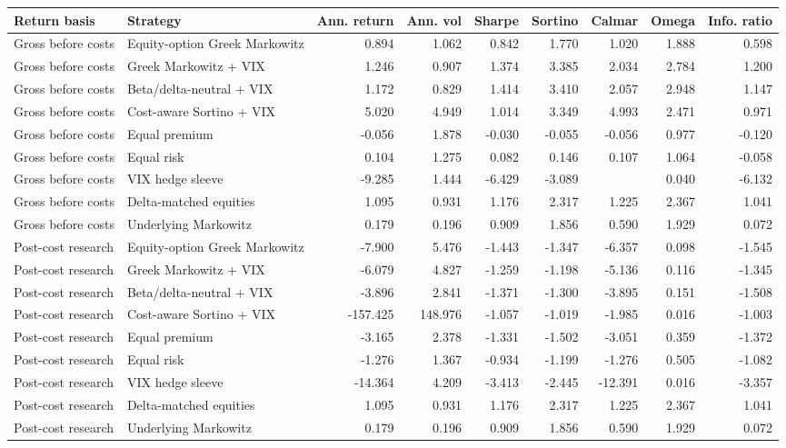\begin{tabular}{llrrrrrrr}
\toprule
Return basis & Strategy & Ann. return & Ann. vol & Sharpe & Sortino & Calmar & Omega & Info. ratio \\
\midrule
Gross before costs & Equity-option Greek Markowitz & 0.894 & 1.062 & 0.842 & 1.770 & 1.020 & 1.888 & 0.598 \\
Gross before costs & Greek Markowitz + VIX & 1.246 & 0.907 & 1.374 & 3.385 & 2.034 & 2.784 & 1.200 \\
Gross before costs & Beta/delta-neutral + VIX & 1.172 & 0.829 & 1.414 & 3.410 & 2.057 & 2.948 & 1.147 \\
Gross before costs & Cost-aware Sortino + VIX & 5.020 & 4.949 & 1.014 & 3.349 & 4.993 & 2.471 & 0.971 \\
Gross before costs & Equal premium & -0.056 & 1.878 & -0.030 & -0.055 & -0.056 & 0.977 & -0.120 \\
Gross before costs & Equal risk & 0.104 & 1.275 & 0.082 & 0.146 & 0.107 & 1.064 & -0.058 \\
Gross before costs & VIX hedge sleeve & -9.285 & 1.444 & -6.429 & -3.089 &  & 0.040 & -6.132 \\
Gross before costs & Delta-matched equities & 1.095 & 0.931 & 1.176 & 2.317 & 1.225 & 2.367 & 1.041 \\
Gross before costs & Underlying Markowitz & 0.179 & 0.196 & 0.909 & 1.856 & 0.590 & 1.929 & 0.072 \\
Post-cost research & Equity-option Greek Markowitz & -7.900 & 5.476 & -1.443 & -1.347 & -6.357 & 0.098 & -1.545 \\
Post-cost research & Greek Markowitz + VIX & -6.079 & 4.827 & -1.259 & -1.198 & -5.136 & 0.116 & -1.345 \\
Post-cost research & Beta/delta-neutral + VIX & -3.896 & 2.841 & -1.371 & -1.300 & -3.895 & 0.151 & -1.508 \\
Post-cost research & Cost-aware Sortino + VIX & -157.425 & 148.976 & -1.057 & -1.019 & -1.985 & 0.016 & -1.003 \\
Post-cost research & Equal premium & -3.165 & 2.378 & -1.331 & -1.502 & -3.051 & 0.359 & -1.372 \\
Post-cost research & Equal risk & -1.276 & 1.367 & -0.934 & -1.199 & -1.276 & 0.505 & -1.082 \\
Post-cost research & VIX hedge sleeve & -14.364 & 4.209 & -3.413 & -2.445 & -12.391 & 0.016 & -3.357 \\
Post-cost research & Delta-matched equities & 1.095 & 0.931 & 1.176 & 2.317 & 1.225 & 2.367 & 1.041 \\
Post-cost research & Underlying Markowitz & 0.179 & 0.196 & 0.909 & 1.856 & 0.590 & 1.929 & 0.072 \\
\bottomrule
\end{tabular}
